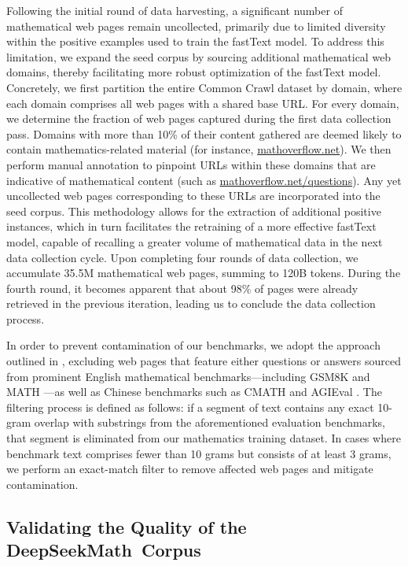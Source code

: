 \begin{itemize}[topsep=0pt]
Following the initial round of data harvesting, a significant number of mathematical web pages remain uncollected, primarily due to limited diversity within the positive examples used to train the fastText model. To address this limitation, we expand the seed corpus by sourcing additional mathematical web domains, thereby facilitating more robust optimization of the fastText model. Concretely, we first partition the entire Common Crawl dataset by domain, where each domain comprises all web pages with a shared base URL. For every domain, we determine the fraction of web pages captured during the first data collection pass. Domains with more than 10\% of their content gathered are deemed likely to contain mathematics-related material (for instance, \url{mathoverflow.net}). 
We then perform manual annotation to pinpoint URLs within these domains that are indicative of mathematical content (such as \url{mathoverflow.net/questions}). Any yet uncollected web pages corresponding to these URLs are incorporated into the seed corpus. This methodology allows for the extraction of additional positive instances, which in turn facilitates the retraining of a more effective fastText model, capable of recalling a greater volume of mathematical data in the next data collection cycle. Upon completing four rounds of data collection, we accumulate 35.5M mathematical web pages, summing to 120B tokens. During the fourth round, it becomes apparent that about 98\% of pages were already retrieved in the previous iteration, leading us to conclude the data collection process.

In order to prevent contamination of our benchmarks, we adopt the approach outlined in \cite{deepseek-coder}, excluding web pages that feature either questions or answers sourced from prominent English mathematical benchmarks—including GSM8K \citep{gsm8k} and MATH \citep{MATH}—as well as Chinese benchmarks such as CMATH \citep{wei2023cmath} and AGIEval \citep{agieval}. The filtering process is defined as follows: if a segment of text contains any exact 10-gram overlap with substrings from the aforementioned evaluation benchmarks, that segment is eliminated from our mathematics training dataset. In cases where benchmark text comprises fewer than 10 grams but consists of at least 3 grams, we perform an exact-match filter to remove affected web pages and mitigate contamination.

\subsection{Validating the Quality of the DeepSeekMath~Corpus}


\end{itemize}
